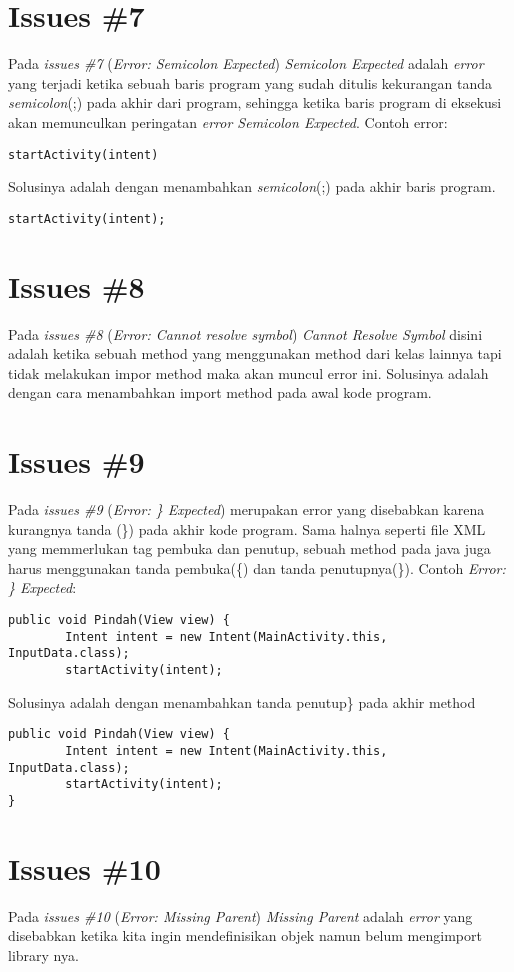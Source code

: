 \section{Issues \#7}
Pada \textit{issues \#7} (\textit{Error: Semicolon Expected}) \textit{Semicolon Expected} adalah \textit{error} yang terjadi ketika sebuah baris program yang sudah ditulis kekurangan tanda \textit{semicolon}(;) pada akhir dari program, sehingga ketika baris program di eksekusi akan memunculkan peringatan \textit{error Semicolon Expected}. Contoh error:
\begin{verbatim}
startActivity(intent)
\end{verbatim}
Solusinya adalah dengan menambahkan \textit{semicolon}(;) pada akhir baris program.
\begin{verbatim}
startActivity(intent);
\end{verbatim}

\section{Issues \#8}
Pada \textit{issues \#8} (\textit{Error: Cannot resolve symbol}) \textit{Cannot Resolve Symbol} disini adalah ketika sebuah method yang menggunakan method dari kelas lainnya tapi tidak melakukan impor method maka akan muncul error ini. Solusinya adalah dengan cara menambahkan import method pada awal kode program.

\section{Issues \#9}
Pada \textit{issues \#9} (\textit{Error: \} Expected}) merupakan error yang disebabkan karena kurangnya tanda (\}) pada akhir kode program. Sama halnya seperti file XML yang memmerlukan tag pembuka dan penutup, sebuah method pada java juga harus menggunakan tanda pembuka(\{) dan tanda penutupnya(\}). Contoh \textit{Error: \} Expected}:
\begin{verbatim}
public void Pindah(View view) {
        Intent intent = new Intent(MainActivity.this, InputData.class);
        startActivity(intent);
\end{verbatim}
Solusinya adalah dengan menambahkan tanda penutup\} pada akhir method
\begin{verbatim}
public void Pindah(View view) {
        Intent intent = new Intent(MainActivity.this, InputData.class);
        startActivity(intent);
}
\end{verbatim}

\section{Issues \#10}
Pada \textit{issues \#10} (\textit{Error: Missing Parent}) \textit{Missing Parent} adalah \textit{error} yang disebabkan ketika kita ingin mendefinisikan objek namun belum mengimport library nya.